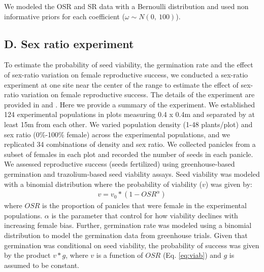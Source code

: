 \documentclass[9pt,twoside,lineno]{pnas-new}
\begin{document}
We modeled the OSR and SR data with a Bernoulli distribution and used non informative priors for each coefficient ($\omega \sim N(0,\ 100)$). 

\subsection*{D. Sex ratio experiment} 
To estimate the probability of seed viability,  the germination rate and the effect of sex-ratio variation on female reproductive success, we conducted a sex-ratio experiment at one site near the center of the range to estimate the effect of sex-ratio variation on female reproductive success.
The details of the experiment are provided in \cite{compagnoni2017can} and \cite{miller2022two}.
Here we provide a summary of the experiment.
We established 124 experimental populations in plots measuring 0.4 x 0.4m and separated by at least 15m from each other.
We varied population density (1-48 plants/plot) and sex ratio (0\%-100\% female) across the experimental populations, and we replicated 34 combinations of density and sex ratio.
We collected panicles from a subset of females in each plot and recorded the number of seeds in each panicle.
We assessed reproductive success (seeds fertilized) using greenhouse-based germination and trazolium-based seed viability assays.
Seed viability was modeled with a binomial distribution where the probability of viability ($v$) was given by:
\begin{align}\label{eq:viab}
	v = v_{0} * (1 - OSR^{\alpha})
\end{align}
\noindent where $OSR$ is the proportion of panicles that were female in the experimental populations.
$\alpha$ is the parameter that control for how viability declines with increasing female bias.
Further, germination rate was modeled using a binomial distribution to model the germination data from greenhouse trials.
Given that germination was conditional on seed viability, the probability of success was given by the product $v*g$, where $v$ is a function of $OSR$ (Eq. \ref{eq:viab}) and $g$ is assumed to be constant.


\clearpage
\end{document}
